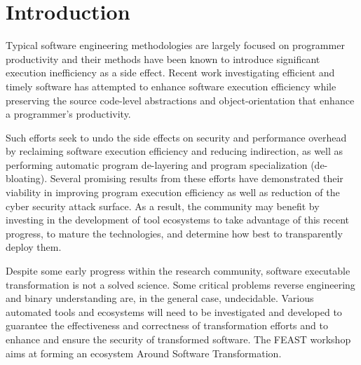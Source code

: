 \documentclass[sigconf]{acmart}
\begin{document}



\maketitle

\section{Introduction}
Typical software engineering methodologies are largely focused on
programmer productivity and their methods have been known to introduce
significant execution inefficiency as a side effect.  Recent work
investigating efficient and timely software has attempted to enhance
software execution efficiency while preserving the source code-level
abstractions and object-orientation that enhance a programmer's
productivity.

Such efforts seek to undo the side effects on security and performance
overhead by reclaiming software execution efficiency and reducing
indirection, as well as performing automatic program de-layering and
program specialization (de-bloating). Several promising results from
these efforts have demonstrated their viability in improving program
execution efficiency as well as reduction of the cyber security attack
surface. As a result, the community may benefit by investing in the
development of tool ecosystems to take advantage of this recent
progress, to mature the technologies, and determine how best to
transparently deploy them.

Despite some early progress within the research community, software
executable transformation is not a solved science. Some critical
problems reverse engineering and binary understanding are, in the
general case, undecidable. Various automated tools and ecosystems will
need to be investigated and developed to guarantee the effectiveness
and correctness of transformation efforts and to enhance and ensure
the security of transformed software. The FEAST workshop aims at
forming an ecosystem Around Software Transformation.
\end{document}
